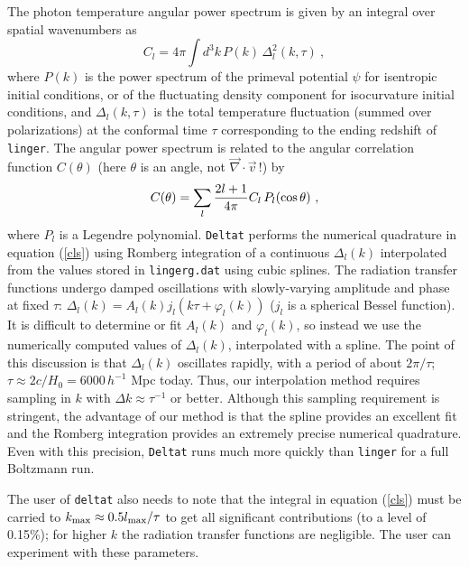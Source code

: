 The photon temperature angular power spectrum is given by an integral
over spatial wavenumbers as \cite{mab1}
\begin{equation}
\label{cls}
  C_l=4\pi\int d^3k\,P(k)\,\Delta_l^2(k,\tau)\ ,
\end{equation}
where $P(k)$ is the power spectrum of the primeval potential $\psi$ for
isentropic initial conditions, or of the fluctuating density component for
isocurvature initial conditions, and $\Delta_l(k,\tau)$ is the total
temperature fluctuation (summed over polarizations) at the conformal time
$\tau$ corresponding to the ending redshift of {\tt linger}.  The angular
power spectrum is related to the angular correlation function $C(\theta)$
(here $\theta$ is an angle, not $\vec\nabla\cdot\vec v\,$!) by
\begin{equation}
\label{angcor}
  C(\theta)=\sum_l {2l+1\over 4\pi} C_l\,P_l(\cos\theta)\ ,
\end{equation}
where $P_l$ is a Legendre polynomial.  {\tt Deltat} performs the numerical
quadrature in equation (\ref{cls}) using Romberg integration of a continuous
$\Delta_l(k)$ interpolated from the values stored in {\tt lingerg.dat}
using cubic splines.  The radiation transfer functions undergo damped
oscillations with slowly-varying amplitude and phase at fixed $\tau$:
$\Delta_l(k)=A_l(k)j_l(k\tau+\varphi_l(k))$ ($j_l$ is a spherical Bessel
function).  It is difficult to determine or fit $A_l(k)$ and $\varphi_l(k)$,
so instead we use the numerically computed values of $\Delta_l(k)$,
interpolated with a spline.  The point of this discussion is that
$\Delta_l(k)$ oscillates rapidly, with a period of about $2\pi/\tau$;
$\tau\approx 2c/H_0=6000\,h^{-1}$ Mpc today.  Thus, our interpolation
method requires sampling in $k$ with $\Delta k \approx \tau^{-1}$ or better.
Although this sampling requirement is stringent, the advantage of our method
is that the spline provides an excellent fit and the Romberg integration
provides an extremely precise numerical quadrature.  Even with this
precision, {\tt Deltat} runs much more quickly than {\tt linger} for
a full Boltzmann run.

The user of {\tt deltat} also needs to note that the integral in equation
(\ref{cls}) must be carried to $k_{\rm max}\approx 0.5 l_{\rm max}/\tau$
to get all significant contributions (to a level of 0.15\%); for higher $k$
the radiation transfer functions are negligible.  The user can experiment
with these parameters.

